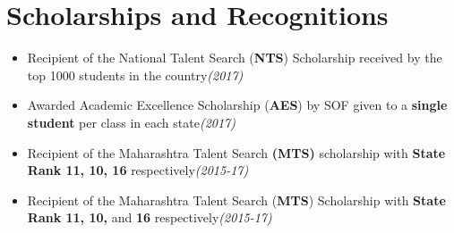 \documentclass[10pt,a4paper,sans]{moderncv}        %
\newcommand{\rhsmall}[1]{\hfill{\footnotesize{\textsl{(#1)}}}}
\begin{document}
\section{Scholarships and Recognitions}
\vspace{0.2em}
\begin{itemize}
	\item Recipient of the National Talent Search (\textbf{NTS}) Scholarship received by the top 1000 students in the country\rhsmall{2017}
	\item Awarded Academic Excellence Scholarship (\textbf{AES}) by SOF given to a \textbf{single  student} per class in each state\rhsmall{2017}%
	\item Recipient of the Maharashtra Talent Search \textbf{(MTS)} scholarship  with \textbf{State Rank 11, 10, 16} respectively\rhsmall{2015-17}%
	\item Recipient of the Maharashtra Talent Search (\textbf{MTS}) Scholarship  with \textbf{State Rank 11, 10,} and \textbf{16} respectively\rhsmall{2015-17}%
\end{itemize}
\end{document}
